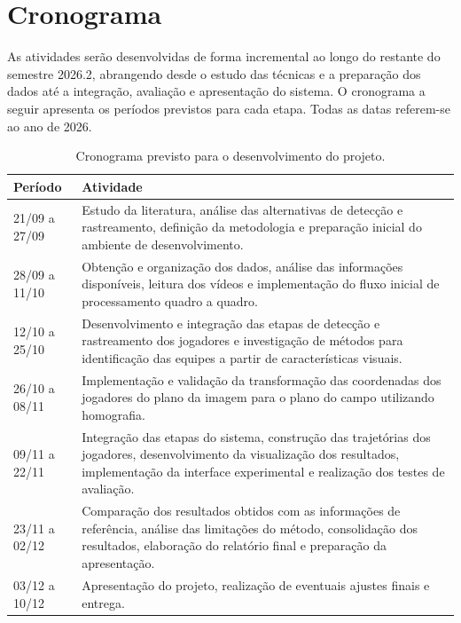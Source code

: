 \section{Cronograma}

As atividades serão desenvolvidas de forma incremental ao longo do restante do semestre 2026.2, abrangendo desde o estudo das técnicas e a preparação dos dados até a integração, avaliação e apresentação do sistema. O cronograma a seguir apresenta os períodos previstos para cada etapa. Todas as datas referem-se ao ano de 2026.

\begin{table}[H]
    \centering
    \caption{Cronograma previsto para o desenvolvimento do projeto.}
    \label{tab:cronograma}
    \begin{tabularx}{\textwidth}{p{3cm} X}
        \toprule
        \textbf{Período} & \textbf{Atividade} \\
        \midrule

        21/09 a 27/09 &
        Estudo da literatura, análise das alternativas de detecção e rastreamento, definição da metodologia e preparação inicial do ambiente de desenvolvimento. \\

        28/09 a 11/10 &
        Obtenção e organização dos dados, análise das informações disponíveis, leitura dos vídeos e implementação do fluxo inicial de processamento quadro a quadro. \\

        12/10 a 25/10 &
        Desenvolvimento e integração das etapas de detecção e rastreamento dos jogadores e investigação de métodos para identificação das equipes a partir de características visuais. \\

        26/10 a 08/11 &
        Implementação e validação da transformação das coordenadas dos jogadores do plano da imagem para o plano do campo utilizando homografia. \\

        09/11 a 22/11 &
        Integração das etapas do sistema, construção das trajetórias dos jogadores, desenvolvimento da visualização dos resultados, implementação da interface experimental e realização dos testes de avaliação. \\

        23/11 a 02/12 &
        Comparação dos resultados obtidos com as informações de referência, análise das limitações do método, consolidação dos resultados, elaboração do relatório final e preparação da apresentação. \\

        03/12 a 10/12 &
        Apresentação do projeto, realização de eventuais ajustes finais e entrega. \\

        \bottomrule
    \end{tabularx}
\end{table}